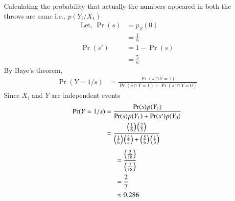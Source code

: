 \documentclass[journal,12pt,twocolumn]{IEEEtran}
\theoremstyle{remark}
\begin{document}
Calculating the probability that actually the numbers appeared in
both the throws are same i.e., $p(Y_i / X_1)$
\begin{align}
\text{Let, } \Pr(s) &= p_{Z}(0)\\
                  &= \frac{1}{6}\\
             \Pr(s') &= 1 - \Pr(s)\\
                    &= \frac{5}{6}
\end{align}
By Baye's theorem, 
\begin{align} 
\Pr(Y=1 / s) &= \frac{\Pr(s \cap Y=1)}{\Pr(s \cap Y=1) + \Pr(s' \cap Y=0)}
\end{align}
Since $X_i$ and $Y$ are independent events
\begin{align}
\Pr(Y=1 / s) &= \frac{\Pr(s)p(Y_1)}{\Pr(s)p(Y_1) + \Pr(s')p(Y_0)}\\
             &= \frac{\left(\frac{1}{6}\right) \left(\frac{2}{3}\right)}{\left(\frac{1}{6}\right) \left(\frac{2}{3}\right) + \left(\frac{5}{6}\right) \left(\frac{1}{3}\right)}
\end{align}
\begin{align}
&= \frac{\left(\frac{2}{18}\right)}{\left(\frac{7}{18}\right)}\\
&= \frac{2}{7}\\
&\approx 0.286
\end{align}
\end{document}
